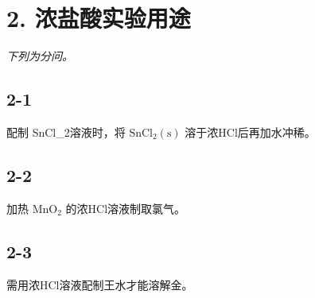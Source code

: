 \section*{2. 浓盐酸实验用途}
\textit{下列为分问。}

\subsection*{2-1}
配制 SnCl_{2}溶液时，将 $\mathrm { S n C l } _ { 2 } ( \mathrm { s } )$ 溶于浓HCl后再加⽔冲稀。

\subsection*{2-2}
加热 $\mathrm { M n O _ { 2 } }$ 的浓HCl溶液制取氯⽓。

\subsection*{2-3}
需⽤浓HCl溶液配制王⽔才能溶解⾦。
